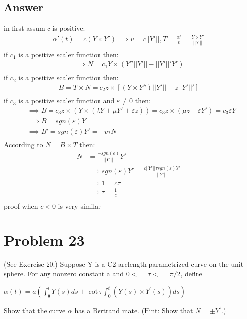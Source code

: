 \documentclass[
	12pt, %
]{fphw}
\theoremstyle{plain}
\begin{document}
\subsection*{Answer}
in first assum c is positive:\\
\begin{align*}
     \alpha'(t) = c(Y \times Y') \implies v = c ||Y'|| , T = \frac{\alpha'}{v} =  \frac{Y \times Y'}{||Y'||}\\
\end{align*}
if $c_1$ is a positive scaler function then:\\
\begin{align*}
\implies N = c_1 Y \times(Y''||Y'|| - ||Y'||'Y')\\
\end{align*}
if $c_2$ is a positive scaler function then:\\
\begin{align*}
B = T \times N = c_2 z \times[(Y \times Y'')||Y'|| - z||Y'||']\\
\end{align*}
if $c_3$ is a positive scaler function and $\varepsilon \neq 0$ then:\\
\begin{align*}
 &\implies B =  c_3 z \times (Y \times(\lambda Y + \mu Y' + \varepsilon z)) = c_3 z \times(\mu z - \varepsilon Y')= c_3 \varepsilon Y\\
 &\implies B = sgn(\varepsilon)Y\\
 &\implies B' = sgn(\varepsilon)Y' = -v\tau N\\
\end{align*}
According to $N = B \times T$ then:
\begin{align*}
N &= \frac{-sgn(\varepsilon)}{||Y'||}Y'\\
&\implies sgn(\varepsilon)Y' = \frac{c||Y'||\tau sgn(\varepsilon)Y'}{||Y'||}\\
&\implies 1 = c\tau\\
&\implies \tau = \frac{1}{c}\\
\end{align*}
proof when $c < 0$ is very similar

\section*{Problem 23}
\begin{problem}
     (See Exercise 20.) Suppose Y is a C2 arclength-parametrized curve on the unit sphere. For any nonzero
     constant a and $0 <= \tau <= \pi/2$, define \\
     \begin{center}
          $\alpha(t) = a( \int_0^t{Y(s)ds} + \cot\tau\int_0^t{(Y(s) \times Y^{'}(s))ds})$
     \end{center}
     Show that the curve $\alpha$ has a Bertrand mate. (Hint: Show that $N = \pm Y^{'}$.)
\end{problem}
\end{document}
